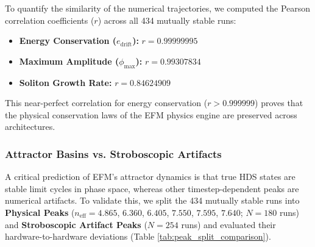 \documentclass[11pt, twoside]{article}
\begin{document}
To quantify the similarity of the numerical trajectories, we computed the Pearson correlation coefficients ($r$) across all 434 mutually stable runs:
\begin{itemize}[leftmargin=*]
    \item \textbf{Energy Conservation ($e_{\text{drift}}$):} $r = 0.99999995$
    \item \textbf{Maximum Amplitude ($\phi_{\text{max}}$):} $r = 0.99307834$
    \item \textbf{Soliton Growth Rate:} $r = 0.84624909$
\end{itemize}
This near-perfect correlation for energy conservation ($r > 0.999999$) proves that the physical conservation laws of the EFM physics engine are preserved across architectures.

\subsubsection{Attractor Basins vs. Stroboscopic Artifacts}
A critical prediction of EFM's attractor dynamics is that true HDS states are stable limit cycles in phase space, whereas other timestep-dependent peaks are numerical artifacts. To validate this, we split the 434 mutually stable runs into \textbf{Physical Peaks} ($n_{\text{eff}} = 4.865$, $6.360$, $6.405$, $7.550$, $7.595$, $7.640$; $N=180$ runs) and \textbf{Stroboscopic Artifact Peaks} ($N=254$ runs) and evaluated their hardware-to-hardware deviations (Table \ref{tab:peak_split_comparison}).

\begin{table}[H]
\centering
\caption{GPU Metric Deviations: Physical HDS Attractors vs. Stroboscopic Artifacts}
\label{tab:peak_split_comparison}
\end{table}
\end{document}
